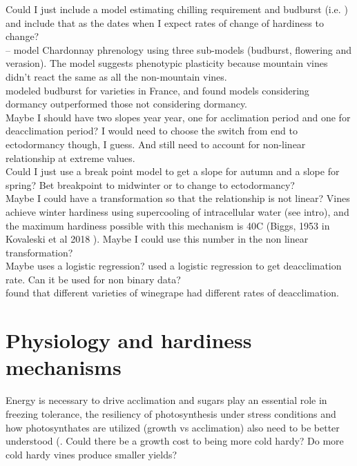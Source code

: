 \documentclass[11pt,letter]{article}
\begin{document}
Could I just include a model estimating chilling requirement and budburst (i.e. \cite{Caffarra2010}) and include that as the dates when I expect rates of change of hardiness to change? \\

\cite{Caffarra2010} – model Chardonnay phrenology using three sub-models (budburst, flowering and verasion). The model suggests phenotypic plasticity because mountain vines didn't react the same as all the non-mountain vines. \\  

\cite{Cortazar-Atauri2009} modeled budburst for varieties in France, and found models considering dormancy outperformed those not considering dormancy. \\  

Maybe I should have two slopes year year, one for acclimation period and one for deacclimation period? I would need to choose the switch from end to ectodormancy though, I guess. And still need to account for non-linear relationship at extreme values. \\ 

Could I just use a break point model to get a slope for autumn and a slope for spring? Bet breakpoint to midwinter or to change to ectodormancy? \\

Maybe I could have a transformation so that the relationship is not linear? Vines achieve winter hardiness using supercooling of intracellular water (see \cite{Kovaleski2018a} intro), and the maximum hardiness possible with this mechanism is 40\textdegree C (Biggs, 1953 in Kovaleski et al 2018 ). Maybe I could use this number in the non linear transformation? \\

Maybe uses a logistic regression? \cite{Kovaleski2018a} used a logistic regression to get deacclimation rate. Can it be used for non binary data?\\

\cite{Kovaleski2018a} found that different varieties of winegrape had different rates of deacclimation. \\ 

\section{Physiology and hardiness mechanisms}  
Energy is necessary to drive acclimation and sugars play an essential role in freezing tolerance, the
resiliency of photosynthesis under stress conditions and how photosynthates are utilized (growth vs acclimation) also need to be better understood (\citep{Gusta2013}. Could there be a growth cost to being more cold hardy? Do more cold hardy vines produce smaller yields? \\
\end{document}

